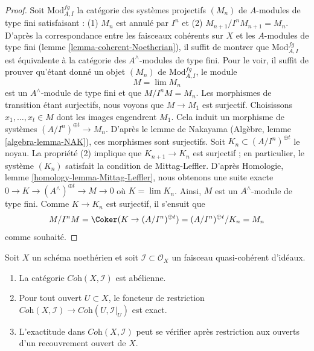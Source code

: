 \begin{proof}
Soit $\text{Mod}^{fg}_{A, I}$ la catégorie des systèmes projectifs $(M_n)$
de $A$-modules de type fini satisfaisant : (1) $M_n$ est annulé par $I^n$ et (2)
$M_{n + 1}/I^nM_{n + 1} = M_n$. D'après la correspondance entre les faisceaux
cohérents sur $X$ et les $A$-modules de type fini (lemme \ref{lemma-coherent-Noetherian}),
il suffit de montrer que $\text{Mod}^{fg}_{A, I}$ est équivalente à la catégorie
des $A^\wedge$-modules de type fini. Pour le voir, il suffit de prouver qu'étant
donné un objet $(M_n)$ de $\text{Mod}^{fg}_{A, I}$, le module
$$
M = \lim M_n
$$
est un $A^\wedge$-module de type fini et que $M/I^nM = M_n$. Les morphismes de
transition étant surjectifs, nous voyons que $M \to M_1$ est surjectif.
Choisissons $x_1, \ldots, x_t \in M$ dont les images engendrent $M_1$.
Cela induit un morphisme de systèmes $(A/I^n)^{\oplus t} \to M_n$.
D'après le lemme de Nakayama (Algèbre, lemme \ref{algebra-lemma-NAK}), ces morphismes sont
surjectifs. Soit $K_n \subset (A/I^n)^{\oplus t}$ le noyau. La
propriété (2) implique que $K_{n + 1} \to K_n$ est surjectif ; en particulier,
le système $(K_n)$ satisfait la condition de Mittag-Leffler.
D'après Homologie, lemme \ref{homology-lemma-Mittag-Leffler},
nous obtenons une suite exacte
$0 \to K \to (A^\wedge)^{\oplus t} \to M \to 0$
où $K = \lim K_n$.
Ainsi, $M$ est un $A^\wedge$-module de
type fini. Comme $K \to K_n$ est surjectif, il s'ensuit que
$$
M/I^nM = \Coker(K \to (A/I^n)^{\oplus t}) =
(A/I^n)^{\oplus t}/K_n = M_n
$$
comme souhaité.
\end{proof}

\begin{lemma}
\label{lemma-inverse-systems-abelian}
Soit $X$ un schéma noethérien et soit $\mathcal{I} \subset \mathcal{O}_X$
un faisceau quasi-cohérent d'idéaux.
\begin{enumerate}
\item La catégorie $\textit{Coh}(X, \mathcal{I})$ est abélienne.
\item Pour tout ouvert $U \subset X$, le foncteur de restriction
$\textit{Coh}(X, \mathcal{I}) \to \textit{Coh}(U, \mathcal{I}|_U)$
est exact.
\item L'exactitude dans $\textit{Coh}(X, \mathcal{I})$ peut se vérifier
après restriction aux ouverts d'un recouvrement ouvert de $X$.
\end{enumerate}
\end{lemma}

